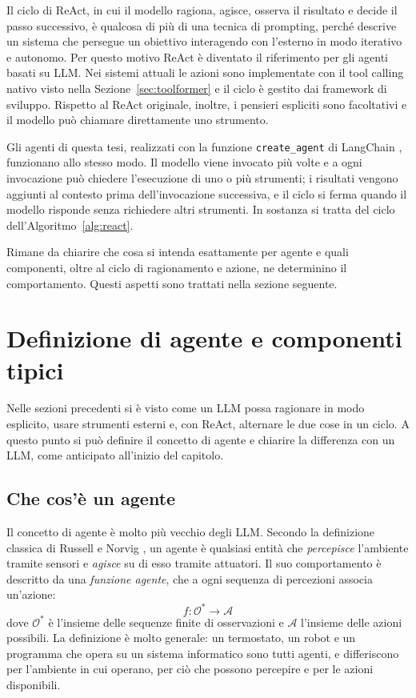 Il ciclo di ReAct, in cui il modello ragiona, agisce, osserva il risultato e decide il passo successivo, è qualcosa di più di una tecnica di prompting, perché descrive un sistema che persegue un obiettivo interagendo con l'esterno in modo iterativo e autonomo. Per questo motivo ReAct è diventato il riferimento per gli agenti basati su LLM. Nei sistemi attuali le azioni sono implementate con il tool calling nativo visto nella Sezione~\ref{sec:toolformer} e il ciclo è gestito dai framework di sviluppo. Rispetto al ReAct originale, inoltre, i pensieri espliciti sono facoltativi e il modello può chiamare direttamente uno strumento.

Gli agenti di questa tesi, realizzati con la funzione \texttt{create\_agent} di LangChain \cite{langchainoverview}, funzionano allo stesso modo. Il modello viene invocato più volte e a ogni invocazione può chiedere l'esecuzione di uno o più strumenti; i risultati vengono aggiunti al contesto prima dell'invocazione successiva, e il ciclo si ferma quando il modello risponde senza richiedere altri strumenti. In sostanza si tratta del ciclo dell'Algoritmo~\ref{alg:react}.

Rimane da chiarire che cosa si intenda esattamente per agente e quali componenti, oltre al ciclo di ragionamento e azione, ne determinino il comportamento. Questi aspetti sono trattati nella sezione seguente.

\section{Definizione di agente e componenti tipici}
\label{sec:definizione-agent}

Nelle sezioni precedenti si è visto come un LLM possa ragionare in modo esplicito, usare strumenti esterni e, con ReAct, alternare le due cose in un ciclo. A questo punto si può definire il concetto di agente e chiarire la differenza con un LLM, come anticipato all'inizio del capitolo.

\subsection{Che cos'è un agente}

Il concetto di agente è molto più vecchio degli LLM. Secondo la definizione classica di Russell e Norvig \cite{russell2020aima}, un agente è qualsiasi entità che \emph{percepisce} l'ambiente tramite sensori e \emph{agisce} su di esso tramite attuatori. Il suo comportamento è descritto da una \emph{funzione agente}, che a ogni sequenza di percezioni associa un'azione:
\[
f : \mathcal{O}^* \rightarrow \mathcal{A}
\]
dove $\mathcal{O}^*$ è l'insieme delle sequenze finite di osservazioni e $\mathcal{A}$ l'insieme delle azioni possibili. La definizione è molto generale: un termostato, un robot e un programma che opera su un sistema informatico sono tutti agenti, e differiscono per l'ambiente in cui operano, per ciò che possono percepire e per le azioni disponibili.


